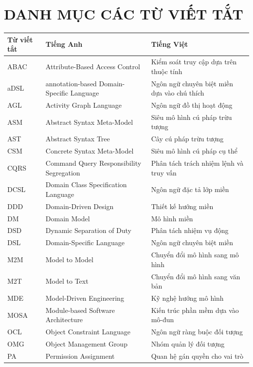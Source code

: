 \chapter*{DANH MỤC CÁC TỪ VIẾT TẮT}

\begin{center}
\small
\begin{tabularx}{\textwidth}{@{}lXX@{}}
\toprule
\textbf{Từ viết tắt} & \textbf{Tiếng Anh} & \textbf{Tiếng Việt} \\
\midrule
ABAC   & Attribute-Based Access Control & Kiểm soát truy cập dựa trên thuộc tính \\
aDSL   & annotation-based Domain-Specific Language & Ngôn ngữ chuyên biệt miền dựa vào chú thích \\
AGL    & Activity Graph Language & Ngôn ngữ đồ thị hoạt động \\
ASM    & Abstract Syntax Meta-Model & Siêu mô hình cú pháp trừu tượng \\
AST    & Abstract Syntax Tree & Cây cú pháp trừu tượng \\
CSM    & Concrete Syntax Meta-Model & Siêu mô hình cú pháp cụ thể \\
CQRS   & Command Query Responsibility Segregation & Phân tách trách nhiệm lệnh và truy vấn \\
DCSL   & Domain Class Specification Language & Ngôn ngữ đặc tả lớp miền \\
DDD    & Domain-Driven Design & Thiết kế hướng miền \\
DM     & Domain Model & Mô hình miền \\
DSD    & Dynamic Separation of Duty & Phân tách nhiệm vụ động \\
DSL    & Domain-Specific Language & Ngôn ngữ chuyên biệt miền \\
M2M    & Model to Model & Chuyển đổi mô hình sang mô hình \\
M2T    & Model to Text & Chuyển đổi mô hình sang văn bản \\
MDE    & Model-Driven Engineering & Kỹ nghệ hướng mô hình \\
MOSA   & Module-based Software Architecture & Kiến trúc phần mềm dựa vào mô-đun \\
OCL    & Object Constraint Language & Ngôn ngữ ràng buộc đối tượng \\
OMG    & Object Management Group & Nhóm quản lý đối tượng \\
PA     & Permission Assignment & Quan hệ gán quyền cho vai trò \\

\end{tabularx}
\end{center}
